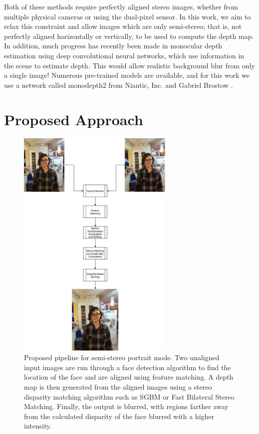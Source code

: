 \documentclass[10pt,twocolumn,letterpaper]{article}
\begin{document}
\par Both of these methods require perfectly aligned stereo images, whether from multiple physical cameras or using the dual-pixel sensor.
In this work, we aim to relax this constraint and allow images which are only semi-stereo; that is, not perfectly aligned horizontally or vertically,
to be used to compute the depth map. In addition, much progress has recently been made in monocular depth estimation using deep convolutional neural
networks, which use information in the scene to estimate depth. This would allow realistic background blur from only a single image!
Numerous pre-trained models are available, and for this work we use a network called monodepth2 from Niantic, Inc. and Gabriel Brostow \cite{monodepth2}.

\section{Proposed Approach}

\begin{figure}[t]
    \begin{center}
        \includegraphics[width=2.95in]{resources/portrait_mode.png} %
    \end{center}
    \caption{Proposed pipeline for semi-stereo portrait mode. Two unaligned input images are run through a face detection algorithm to find the location of the face and are aligned using feature matching.
    A depth map is then generated from the aligned images using a stereo disparity matching algorithm such as SGBM or Fast Bilateral Stereo Matching. Finally, the output is blurred, with regions farther away
    from the calculated disparity of the face blurred with a higher intensity.}
    \label{fig:pipeline}
\end{figure}
\end{document}
